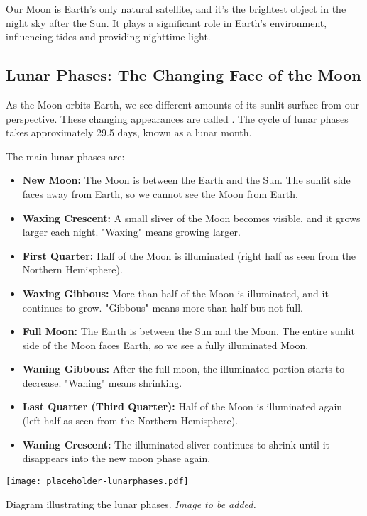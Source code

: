 \FloatBarrier

Our Moon is Earth's only natural satellite, and it's the brightest object in the night sky after the Sun.  It plays a significant role in Earth's environment, influencing tides and providing nighttime light.

\subsection{Lunar Phases: The Changing Face of the Moon}

As the Moon orbits Earth, we see different amounts of its sunlit surface from our perspective. These changing appearances are called . The cycle of lunar phases takes approximately 29.5 days, known as a lunar month.

The main lunar phases are:

\begin{itemize}
    \item \textbf{New Moon:} The Moon is between the Earth and the Sun. The sunlit side faces away from Earth, so we cannot see the Moon from Earth.
    \item \textbf{Waxing Crescent:}  A small sliver of the Moon becomes visible, and it grows larger each night. "Waxing" means growing larger.
    \item \textbf{First Quarter:} Half of the Moon is illuminated (right half as seen from the Northern Hemisphere).
    \item \textbf{Waxing Gibbous:} More than half of the Moon is illuminated, and it continues to grow. "Gibbous" means more than half but not full.
    \item \textbf{Full Moon:} The Earth is between the Sun and the Moon. The entire sunlit side of the Moon faces Earth, so we see a fully illuminated Moon.
    \item \textbf{Waning Gibbous:} After the full moon, the illuminated portion starts to decrease. "Waning" means shrinking.
    \item \textbf{Last Quarter (Third Quarter):} Half of the Moon is illuminated again (left half as seen from the Northern Hemisphere).
    \item \textbf{Waning Crescent:} The illuminated sliver continues to shrink until it disappears into the new moon phase again.
\end{itemize}

\begin{marginfigure}
\texttt{[image: placeholder-lunarphases.pdf]}
\caption{\label{fig:lunarphases}Diagram illustrating the lunar phases. \textit{Image to be added.}}
\end{marginfigure}

